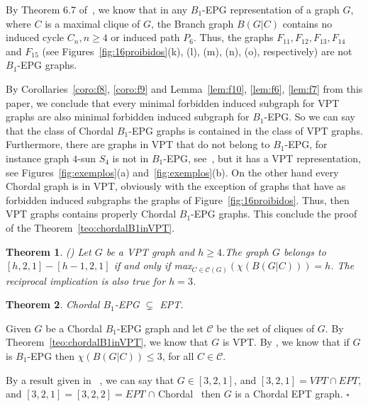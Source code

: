 \documentclass[9pt]{entcs}
\newtheorem{teo}{Theorem}[section]
\begin{document}
By Theorem 6.7 of~\cite{golumbic2009}, we know that in any $B_1$-EPG representation of a graph $G$, where $C$ is a maximal clique of $G$, the Branch graph $B(G|C)$ contains no induced cycle $C_n, n\geq 4$ or induced path $P_6$. Thus, the graphs $F_{11}, F_{12}, F_{13}, F_{14}$ and $F_{15}$  (see Figures~\ref{fig:16proibidos}(k), (l), (m), (n), (o), respectively)  are not $B_1$-EPG graphs.

By Corollaries~\ref{coro:f8}, \ref{coro:f9} and Lemma~\ref{lem:f10}, \ref{lem:f6}, \ref{lem:f7} from this paper, we conclude that every minimal forbidden induced subgraph for VPT graphs are also minimal forbidden induced subgraph for $B_1$-EPG. So we can say that the class of Chordal $B_1$-EPG graphs is contained in the class of VPT graphs. Furthermore, there are graphs in VPT that do not belong to $B_1$-EPG, for instance graph $4$-sun $S_4$ is not in $B_1$-EPG, see~\cite{golumbic2009}, but it has a VPT representation, see Figures~\ref{fig:exemplos}(a) and~\ref{fig:exemplos}(b). On the other hand every Chordal graph is in VPT, obviously with the exception of graphs that have as forbidden induced subgraphs the graphs of Figure~\ref{fig:16proibidos}. Thus, then  VPT graphs contains properly Chordal $B_1$-EPG graphs. This conclude the proof of the Theorem~\ref{teo:chordalB1inVPT}.



\begin{teo}
(\cite{alcon2014recognizing}) Let $G$ be a VPT graph and $h\geq 4$.The graph $G$ belongs to $[h,2,1]-[h-1,2,1]$ if and only if max$_{C\in\mathcal{C}(G)}(\chi (B(G|C)))=h$. The reciprocal implication is also true for $h=3$.
\end{teo}


\begin{teo}\label{teo:b1epgept}
Chordal $B_1$-EPG $\subsetneq$ EPT. 
\end{teo}

\begin{pf}
Given $G$ be a  Chordal $B_1$-EPG graph and let  $\mathcal{C}$  be the set of cliques of $G$. By Theorem~\ref{teo:chordalB1inVPT}, we know that $G$ is VPT. By \cite{golumbic2009}, we know that if $G$ is $B_1$-EPG then $\chi (B(G|C))\leq 3$,  for all $C \in \mathcal{C}$.

By a result given in ~\cite{alcon2014recognizing}, we can say that $G \in [3,2,1]$, and $[3,2,1] = VPT \cap EPT$, and $[3,2,1] = [3,2,2] = EPT$ $\cap$ Chordal~\cite{golumbic1985} then $G$ is a Chordal EPT graph.
 $\square$\end{pf} 
\end{document}
